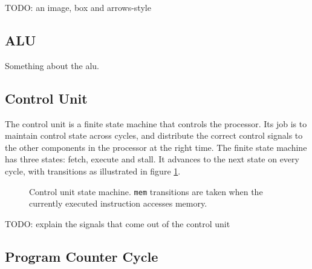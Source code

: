 TODO: an image, box and arrows-style

\subsection{ALU}

Something about the alu.

\subsection{Control Unit}

The control unit is a finite state machine that controls the processor.
Its job is to maintain control state across cycles, and distribute the correct control signals to the other components in the processor at the right time.
The finite state machine has three states: fetch, execute and stall.
It advances to the next state on every cycle, with transitions as illustrated in figure \ref{figure:control-unit-state-machine}.

\begin{figure}[h]
    \begin{center}
            \caption{
                Control unit state machine.
                \texttt{mem} transitions are taken when the currently executed instruction accesses memory.
            }
            \label{figure:control-unit-state-machine}
    \end{center}
\end{figure}

TODO: explain the signals that come out of the control unit

\subsection{Program Counter Cycle}

